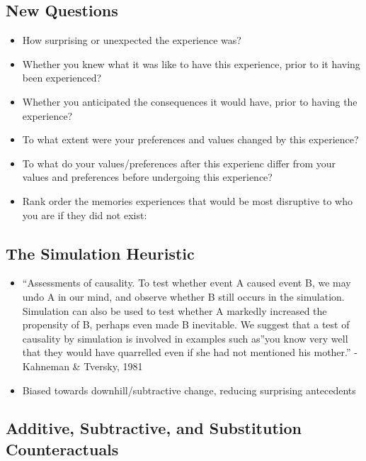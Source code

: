 \documentclass[
  .7em,
  letterpaper,
  DIV=11,
  numbers=noendperiod]{scrartcl}
\begin{document}
\hypertarget{new-questions}{%
\subsection{New Questions}\label{new-questions}}

\begin{itemize}
\item
  How surprising or unexpected the experience was?
\item
  Whether you knew what it was like to have this experience, prior to it
  having been experienced?
\item
  Whether you anticipated the consequences it would have, prior to
  having the experience?
\item
  To what extent were your preferences and values changed by this
  experience?
\item
  To what do your values/preferences after this experienc differ from
  your values and preferences before undergoing this experience?
\item
  Rank order the memories experiences that would be most disruptive to
  who you are if they did not exist:
\end{itemize}

\hypertarget{the-simulation-heuristic}{%
\subsection{The Simulation Heuristic}\label{the-simulation-heuristic}}

\begin{itemize}
\item
  ``Assessments of causality. To test whether event A caused event B, we
  may undo A in our mind, and observe whether B still occurs in the
  simulation. Simulation can also be used to test whether A markedly
  increased the propensity of B, perhaps even made B inevitable. We
  suggest that a test of causality by simulation is involved in examples
  such as''you know very well that they would have quarrelled even if
  she had not mentioned his mother.'' - Kahneman \& Tversky, 1981
\item
  Biased towards downhill/subtractive change, reducing surprising
  antecedents
\end{itemize}

\hypertarget{additive-subtractive-and-substitution-counteractuals}{%
\subsection{Additive, Subtractive, and Substitution
Counteractuals}\label{additive-subtractive-and-substitution-counteractuals}}
\end{document}
